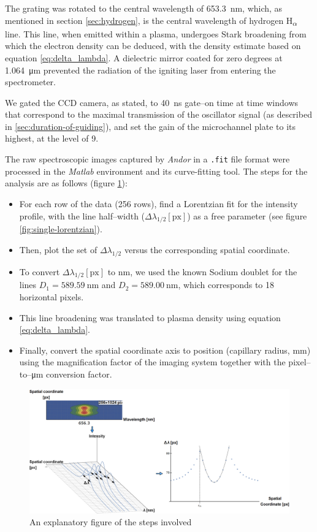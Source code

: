 \documentclass[../main.tex]{subfiles}
\begin{document}
The grating was rotated to the central wavelength of \SI{653.3}{\nm}, which, as mentioned in section \ref{sec:hydrogen}, is the central wavelength of hydrogen H\textsubscript{$\alpha$} line. This line, when emitted within a plasma, undergoes Stark broadening from which the electron density can be deduced, with the density estimate based on equation \ref{eq:delta_lambda}. A dielectric mirror coated for zero degrees at \SI{1.064}{\um} prevented the radiation of the igniting laser from entering the spectrometer.

We gated the CCD camera, as stated, to \SI{40}{\ns} gate--on time at time windows that correspond to the maximal transmission of the oscillator signal (as described in \ref{sec:duration-of-guiding}), and set the gain of the microchannel plate to its highest, at the level of 9.

The raw spectroscopic images captured by \textit{Andor} in a \texttt{.fit} file format were processed in the \textit{Matlab} environment and its curve-fitting tool. The steps for the analysis are as follows (figure \ref{fig:spectra_analysis}):
\begin{itemize}[label={$-$}]
\item For each row of the data (256 rows), find a Lorentzian fit for the intensity profile, with the line half--width ($\Delta\lambda_{1/2}\left[\text{px}\right]$) as a free parameter (see figure \ref{fig:single-lorentzian}).
\item Then, plot the set of $\Delta\lambda_{1/2}$ versus the corresponding spatial coordinate.
\item To convert $\Delta\lambda_{1/2}\left[\text{px}\right]$ to \si{\nm}, we used the known Sodium doublet for the lines $D_1=\SI{589.59}{\nm}$ and $D_2=\SI{589.00}{\nm}$, which corresponds to 18 horizontal pixels.
\item This line broadening was translated to plasma density using equation \ref{eq:delta_lambda}.
\item Finally, convert the spatial coordinate axis to position (capillary radius, \si{\mm}) using the magnification factor of the imaging system together with the pixel--to--\si{\um} conversion factor.
\end{itemize}

\begin{figure}
    \centering
    \includegraphics[width=\textwidth]{figures/spectro/spectra_analysis.png}
    \caption{An explanatory figure of the steps involved}
    \label{fig:spectra_analysis}
\end{figure}
\end{document}
